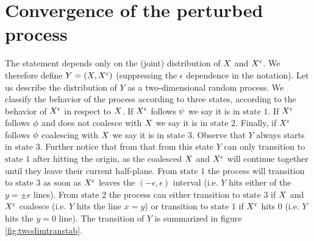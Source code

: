 {
\newpage

\section{Convergence of the perturbed process}
\label{sec:proof-of-lem:resamplede-to-sampled}

\newcommand{\bandwidth}{\delta}
\newcommand{\rotproc}{Y_\circ}

\newcommand{\union}{\cup}
\renewcommand{\L}{L^+ \union L^-}
\newcommand{\Le}{L^\epsilon}
\newcommand{\statenoweb}{\text{state }1}
\newcommand{\statewebapart}{\text{state }2}
\newcommand{\statewebtogether}{\text{state }3}
\newcommand{\twodim}{Y}


The statement
\statementoflemresampledetosampled{} depends only on the
(joint) distribution of $X$ and $X^{\epsilon}$. We therefore define $\twodim=(\sampled, \resamplede)$ (suppressing the $\epsilon$ dependence in the notation). Let us describe the distribution of $\twodim$
 as a two-dimensional random process.
We classify the behavior of the process according to three states, according to
the behavior of $X^{\epsilon}$ in respect to $X$. If $X^{\epsilon}$ follows
$\psi$ we say it is in $\statenoweb$. If $X^{\epsilon}$ follows $\phi$
and does not coalesce with $X$ we say it is in $\statewebapart$. Finally,
if $X^{\epsilon}$ follows $\phi$ coalescing with $X$ we say it is in
$\statewebtogether$.  Observe that $\twodim$ always starts
in $\statewebtogether$. Further notice that from that from this state $\twodim$
can only transition to $\statenoweb$ after hitting the origin, as the coalesced
$X$ and $X^{\epsilon}$ will continue together until they leave their
current half-plane. From $\statenoweb$ the process will transition to
$\statewebtogether$ as soon as $X^{\epsilon}$ leaves the $(-\epsilon,\epsilon)$
interval (i.e. $\twodim$ hits either of the $y=\pm\epsilon$ lines). From
$\statewebapart$ the process can either transition to $\statewebtogether$
if $X$ and $X^{\epsilon}$ coalesce (i.e. $\twodim$ hits the line $x=y$)
or transition to $\statenoweb$ if $X^{\epsilon}$ hits $0$ (i.e. $\twodim$ hits
the $y=0$ line). The transition of $\twodim$ is summarized in figure
\ref{fig:twodimtranstab}.

}
